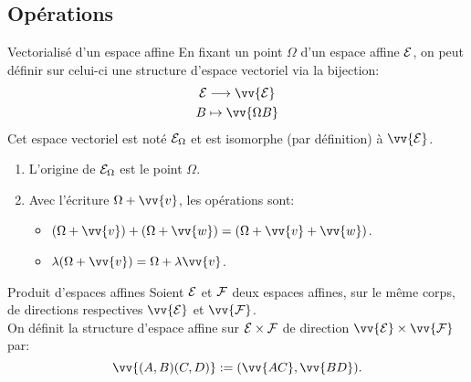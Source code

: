 \documentclass[
bigger]{m53beamer}
\begin{document}
\subsection{Opérations}
  \begin{frame}{Vectorialisé d'un espace affine}
    En fixant un point $\Omega$ d'un espace affine $\mathcal{E}$, on peut définir sur celui-ci une structure d'espace vectoriel via la bijection:
    \begin{gather*}
      \ens{E} \longrightarrow \vv{\ens{E}}\\
      B \mapsto \vv{\Omega B}
    \end{gather*}\pause
    Cet espace vectoriel est noté $\mathcal{E}_{\Omega}$ et est isomorphe (par définition) à $\vv{\ens{E}}$.
    \begin{enumerate}[<+(1)->]
      \item L'origine de $\mathcal{E}_{\Omega}$ est le point $\Omega$.
      \item Avec l'écriture $\Omega+\vv{v}$, les opérations sont:
      \begin{itemize}[<+(1)->]
        \item $(\Omega+\vv{v})+(\Omega+\vv{w})=(\Omega+\vv{v}+\vv{w})$.
        \item $\lambda(\Omega+\vv{v})=\Omega+\lambda\vv{v}$.
      \end{itemize}
    \end{enumerate}
  \end{frame}
  \begin{frame}{Produit d'espaces affines}
    Soient $\mathcal{E}$ et $\mathcal{F}$ deux espaces affines, sur le même corps, de directions respectives $\vv{\ens{E}}$ et $\vv{\ens{F}}$.\\
    On définit la structure d'espace affine  sur $\mathcal{E} \times \mathcal{F}$ de direction $\vv{\ens{E}} \times \vv{\ens{F}}$ par:
    $$
      \vv{(A,B)(C,D)}:=(\vv{AC},\vv{BD}).
    $$
  \end{frame}
\end{document}
